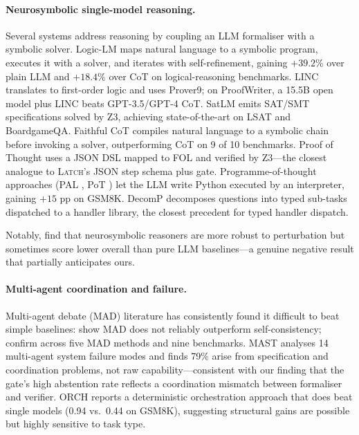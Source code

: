 \documentclass[11pt]{article}
\newcommand{\latch}{\textsc{Latch}}
\begin{document}
\paragraph{Neurosymbolic single-model reasoning.}
Several systems address reasoning by coupling an LLM formaliser with a
symbolic solver.  Logic-LM \citep{logicLM} maps natural language to a
symbolic program, executes it with a solver, and iterates with
self-refinement, gaining $+39.2$\% over plain LLM and $+18.4$\% over CoT
on logical-reasoning benchmarks.  LINC \citep{LINC} translates to first-order
logic and uses Prover9; on ProofWriter, a 15.5B open model plus LINC beats
GPT-3.5/GPT-4 CoT.  SatLM \citep{satlm} emits SAT/SMT specifications
solved by Z3, achieving state-of-the-art on LSAT and BoardgameQA.
Faithful CoT \citep{faithfulCoT} compiles natural language to a symbolic
chain before invoking a solver, outperforming CoT on 9 of 10 benchmarks.
Proof of Thought \citep{proofOfThought} uses a JSON DSL mapped to FOL and
verified by Z3---the closest analogue to \latch{}'s JSON step schema plus
gate.  Programme-of-thought approaches (PAL \citep{pal}, PoT \citep{pot})
let the LLM write Python executed by an interpreter, gaining $+15$ pp on
GSM8K.  DecomP \citep{decomp} decomposes questions into typed sub-tasks
dispatched to a handler library, the closest precedent for typed handler
dispatch.

Notably, \citet{robustnessNeurosym} find that neurosymbolic reasoners are
more robust to perturbation but sometimes score lower overall than pure
LLM baselines---a genuine negative result that partially anticipates ours.

\paragraph{Multi-agent coordination and failure.}
Multi-agent debate (MAD) literature has consistently found it difficult to
beat simple baselines: \citet{goingMAD} show MAD does not reliably outperform
self-consistency; \citet{ifMAD} confirm across five MAD methods and nine
benchmarks.  MAST \citep{mast} analyses 14 multi-agent system failure modes
and finds 79\% arise from specification and coordination problems, not raw
capability---consistent with our finding that the gate's high abstention
rate reflects a coordination mismatch between formaliser and verifier.
ORCH \citep{orch} reports a deterministic orchestration approach that does
beat single models (0.94 vs.\ 0.44 on GSM8K), suggesting structural gains
are possible but highly sensitive to task type.
\end{document}
